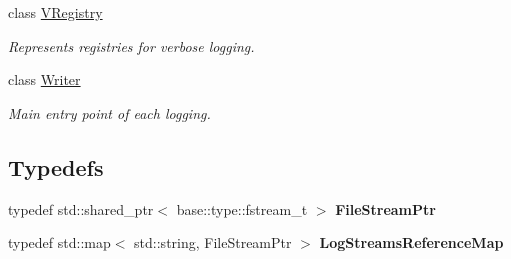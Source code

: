 \begin{DoxyCompactItemize}
class \hyperlink{classel_1_1base_1_1VRegistry}{V\+Registry}
\begin{DoxyCompactList}\small\item\em Represents registries for verbose logging. \end{DoxyCompactList}\item 
class \hyperlink{classel_1_1base_1_1Writer}{Writer}
\begin{DoxyCompactList}\small\item\em Main entry point of each logging. \end{DoxyCompactList}\end{DoxyCompactItemize}
\subsection*{Typedefs}
\begin{DoxyCompactItemize}
\item 
typedef std\+::shared\+\_\+ptr$<$ base\+::type\+::fstream\+\_\+t $>$ {\bfseries File\+Stream\+Ptr}\hypertarget{namespaceel_1_1base_a8b10bcfd674533f8340cd8c39fbf5233}{}\label{namespaceel_1_1base_a8b10bcfd674533f8340cd8c39fbf5233}

\item 
typedef std\+::map$<$ std\+::string, File\+Stream\+Ptr $>$ {\bfseries Log\+Streams\+Reference\+Map}\hypertarget{namespaceel_1_1base_af7602da9fe1d6c75985184fb0e39fd11}{}\label{namespaceel_1_1base_af7602da9fe1d6c75985184fb0e39fd11}

\end{DoxyCompactItemize}
